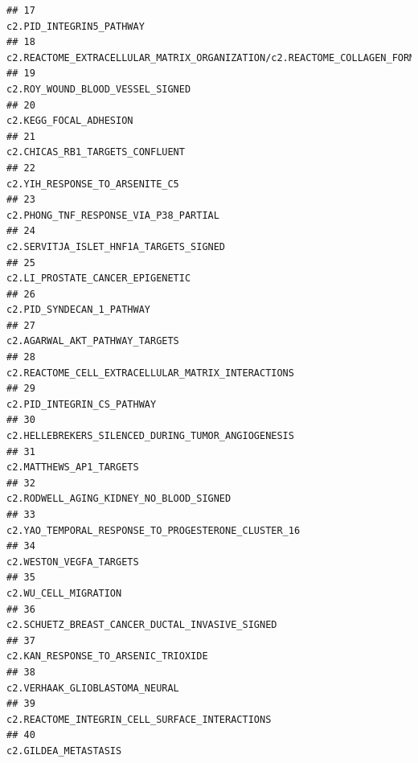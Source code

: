 \documentclass{article}\usepackage[]{graphicx}\usepackage[]{color}
\makeatletter
\newenvironment{kframe}{%
 \def\at@end@of@kframe{}%
 \ifinner\ifhmode%
  \def\at@end@of@kframe{\end{minipage}}%
  \begin{minipage}{\columnwidth}%
 \fi\fi%
 \def\FrameCommand##1{\hskip\@totalleftmargin \hskip-\fboxsep
 \colorbox{shadecolor}{##1}\hskip-\fboxsep
     \hskip-\linewidth \hskip-\@totalleftmargin \hskip\columnwidth}%
 \MakeFramed {\advance\hsize-\width
   \@totalleftmargin\z@ \linewidth\hsize
   \@setminipage}}%
 {\par\unskip\endMakeFramed%
 \at@end@of@kframe}
\newenvironment{knitrout}{}{} %
\makeatother
\begin{document}
\begin{knitrout}
\begin{kframe}
\begin{verbatim}
## 17                                                                               c2.PID_INTEGRIN5_PATHWAY
## 18                           c2.REACTOME_EXTRACELLULAR_MATRIX_ORGANIZATION/c2.REACTOME_COLLAGEN_FORMATION
## 19                                                                       c2.ROY_WOUND_BLOOD_VESSEL_SIGNED
## 20                                                                                 c2.KEGG_FOCAL_ADHESION
## 21                                                                        c2.CHICAS_RB1_TARGETS_CONFLUENT
## 22                                                                         c2.YIH_RESPONSE_TO_ARSENITE_C5
## 23                                                                  c2.PHONG_TNF_RESPONSE_VIA_P38_PARTIAL
## 24                                                                 c2.SERVITJA_ISLET_HNF1A_TARGETS_SIGNED
## 25                                                                       c2.LI_PROSTATE_CANCER_EPIGENETIC
## 26                                                                              c2.PID_SYNDECAN_1_PATHWAY
## 27                                                                         c2.AGARWAL_AKT_PATHWAY_TARGETS
## 28                                                     c2.REACTOME_CELL_EXTRACELLULAR_MATRIX_INTERACTIONS
## 29                                                                             c2.PID_INTEGRIN_CS_PATHWAY
## 30                                                     c2.HELLEBREKERS_SILENCED_DURING_TUMOR_ANGIOGENESIS
## 31                                                                                c2.MATTHEWS_AP1_TARGETS
## 32                                                                c2.RODWELL_AGING_KIDNEY_NO_BLOOD_SIGNED
## 33                                                    c2.YAO_TEMPORAL_RESPONSE_TO_PROGESTERONE_CLUSTER_16
## 34                                                                                c2.WESTON_VEGFA_TARGETS
## 35                                                                                   c2.WU_CELL_MIGRATION
## 36                                                        c2.SCHUETZ_BREAST_CANCER_DUCTAL_INVASIVE_SIGNED
## 37                                                                    c2.KAN_RESPONSE_TO_ARSENIC_TRIOXIDE
## 38                                                                         c2.VERHAAK_GLIOBLASTOMA_NEURAL
## 39                                                         c2.REACTOME_INTEGRIN_CELL_SURFACE_INTERACTIONS
## 40                                                                                   c2.GILDEA_METASTASIS

\end{verbatim}
\end{kframe}
\end{knitrout}
\end{document}
